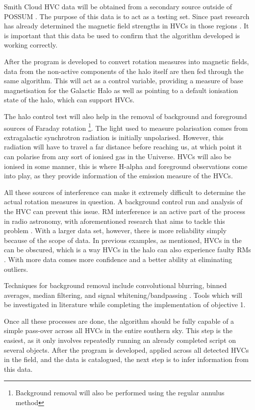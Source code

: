 Smith Cloud HVC data will be obtained from a secondary source outside of POSSUM \cite{ID18, ID26, ID28}. The purpose of this data is to act as a testing set. Since past research has already determined the magnetic field strengths in HVCs in those regions \cite{ID26}. It is important that this data be used to confirm that the algorithm developed is working correctly.

After the program is developed to convert rotation measures into magnetic fields, data from the non-active components of the halo itself are then fed through the same algorithm. This will act as a control variable, providing a measure of base magnetisation for the Galactic Halo as well as pointing to a default ionisation state of the halo, which can support HVCs.

The halo control test will also help in the removal of background and foreground sources of Faraday rotation \footnote{Background removal will also be performed using the regular annulus method}. The light used to measure polarisation comes from extragalactic synchrotron radiation is initially unpolarised. However, this radiation will have to travel a far distance before reaching us, at which point it can polarise from any sort of ionised gas in the Universe. HVCs will also be ionised in some manner, this is where H-alpha and foreground observations come into play, as they provide information of the emission measure of the HVCs.

All these sources of interference can make it extremely difficult to determine the actual rotation measures in question. A background control run and analysis of the HVC can prevent this issue. RM interference is an active part of the process in radio astronomy, with aforementioned research that aims to tackle this problem \cite{ID21}. With a larger data set, however, there is more reliability simply because of the scope of data. In previous examples, as mentioned, HVCs in the can be obscured, which is a way HVCs in the halo can also experience faulty RMs \cite{ID2, ID36}. With more data comes more confidence and a better ability at eliminating outliers.

Techniques for background removal include convolutional blurring, binned averages, median filtering, and signal whitening/bandpassing \cite{ID38, ID39, ID40}. Tools which will be investigated in literature while completing the implementation of objective 1.

Once all these processes are done, the algorithm should be fully capable of a simple pass-over across all HVCs in the entire southern sky. This step is the easiest, as it only involves repeatedly running an already completed script on several objects. After the program is developed, applied across all detected HVCs in the field, and the data is catalogued, the next step is to infer information from this data.


